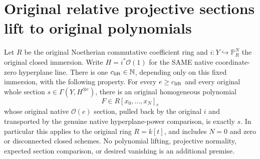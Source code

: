 \section{Original relative projective sections lift to original polynomials}
\label{sec:c0n-section-polynomial-lift}

\begin{lemma}
\label{lem:c0n-relative-homogeneous-polynomial-lift}
\leanok
{}
Let $R$ be the original Noetherian commutative coefficient ring and
$i:Y\hookrightarrow\mathbb P_R^N$ the original closed immersion. Write
$H=i^*\mathcal O(1)$ for the SAME native coordinate-zero hyperplane line.
There is one $c_{\rm lift}\in\mathbb N$, depending only on this fixed
immersion, with the following property. For every $e\ge c_{\rm lift}$ and
every original whole section $s\in\Gamma(Y,H^{\otimes e})$, there is an
original homogeneous polynomial
\[
 F\in R[x_0,\ldots,x_N]_e
\]
whose original native $\mathcal O(e)$ section, pulled back by the original
$i$ and transported by the genuine native hyperplane-power comparison, is
exactly $s$. In particular this applies to the original ring $R=k[t]$,
and includes $N=0$ and zero or disconnected closed schemes. No polynomial
lifting, projective normality, expected section comparison, or desired
vanishing is an additional premise.
\end{lemma}
